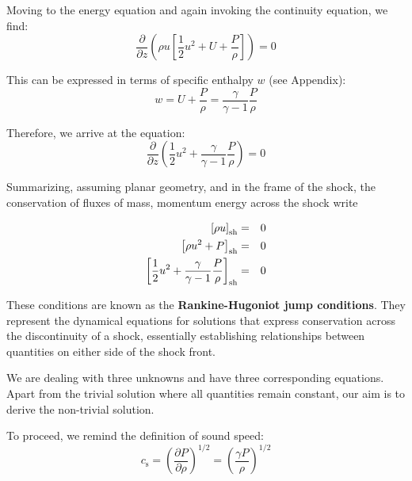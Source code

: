 
Moving to the energy equation and again invoking the continuity equation, we find:
%
\begin{equation}
\frac{\partial}{\partial z} \left( \rho u \left[ \frac{1}{2} u^2 + U + \frac{P}{\rho} \right] \right) = 0 
\end{equation}

This can be expressed in terms of specific enthalpy \( w \) (see Appendix):
%
\begin{equation}
w = U + \frac{P}{\rho} = \frac{\gamma}{\gamma - 1}\frac{P}{\rho}
\end{equation}

Therefore, we arrive at the equation:
%
\begin{equation}
\frac{\partial}{\partial z} \left( \frac{1}{2} u^2 + \frac{\gamma}{\gamma - 1}\frac{P}{\rho} \right) = 0 
\end{equation}

Summarizing, assuming planar geometry, and in the frame of the shock, the conservation of fluxes of mass, momentum energy across the shock write
%
\begin{remark}
\begin{eqnarray}
\left[ \rho u \right]_{\rm sh} & = & 0 \label{eq:RH1} \\
\left[ \rho u^2 + P \right]_{\rm sh} & = & 0 \label{eq:RH2} \\
\left[ \frac{1}{2} u^2 +\frac{\gamma}{\gamma - 1} \frac{P}{\rho} \right]_{\rm sh} & = & 0 \label{eq:RH3}
\end{eqnarray}
\end{remark}

These conditions are known as the \textbf{Rankine-Hugoniot jump conditions}. They represent the dynamical equations for solutions that express conservation across the discontinuity of a shock, essentially establishing relationships between quantities on either side of the shock front.

We are dealing with three unknowns and have three corresponding equations. Apart from the trivial solution where all quantities remain constant, our aim is to derive the non-trivial solution.

To proceed, we remind the definition of sound speed:
%
\begin{equation}
c_{\text{s}} = \left( \frac{\partial P}{\partial \rho} \right)^{1/2} = \left(\frac{\gamma P}{\rho}\right)^{1/2}
\end{equation}

